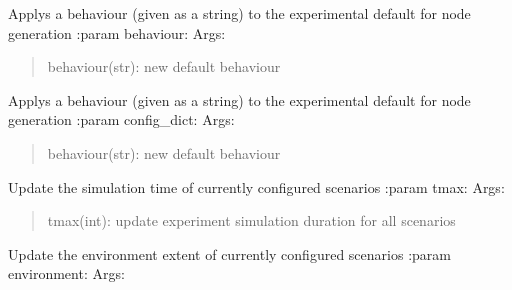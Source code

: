 \documentclass[letterpaper,10pt,english]{sphinxmanual}
\begin{document}
\begin{fulllineitems}
\begin{fulllineitems}
\label{index:polybos.ExperimentManager.update_default_behaviour}
Applys a behaviour (given as a string) to the experimental default for node generation
:param behaviour:
Args:
\begin{quote}

behaviour(str): new default behaviour
\end{quote}

\end{fulllineitems}


\begin{fulllineitems}
\label{index:polybos.ExperimentManager.update_default_node}
Applys a behaviour (given as a string) to the experimental default for node generation
:param config\_dict:
Args:
\begin{quote}

behaviour(str): new default behaviour
\end{quote}

\end{fulllineitems}


\begin{fulllineitems}
\label{index:polybos.ExperimentManager.update_duration}
Update the simulation time of currently configured scenarios
:param tmax:
Args:
\begin{quote}

tmax(int): update experiment simulation duration for all scenarios
\end{quote}

\end{fulllineitems}


\begin{fulllineitems}
\label{index:polybos.ExperimentManager.update_environment}
Update the environment extent of currently configured scenarios
:param environment:
Args:
\begin{quote}


\end{quote}
\end{fulllineitems}
\end{fulllineitems}
\end{document}
